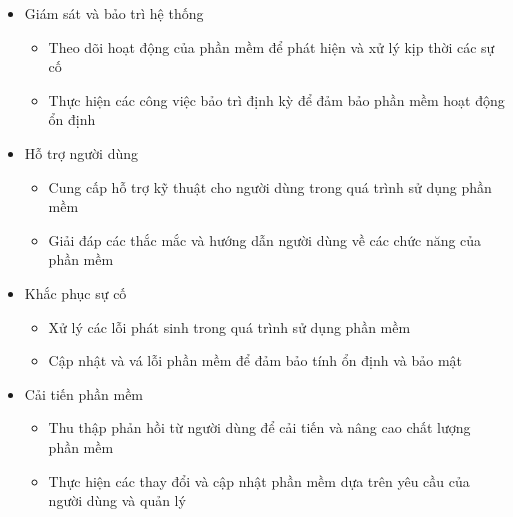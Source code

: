 {\begin{minipage}{\textwidth}
    \begin{itemize}
        \item Giám sát và bảo trì hệ thống
        \begin{itemize}
            \item Theo dõi hoạt động của phần mềm để phát hiện và xử lý kịp thời các sự cố
            \item Thực hiện các công việc bảo trì định kỳ để đảm bảo phần mềm hoạt động ổn định
        \end{itemize}
        \item Hỗ trợ người dùng
        \begin{itemize}
            \item Cung cấp hỗ trợ kỹ thuật cho người dùng trong quá trình sử dụng phần mềm
            \item Giải đáp các thắc mắc và hướng dẫn người dùng về các chức năng của phần mềm
        \end{itemize}
        \item Khắc phục sự cố
        \begin{itemize}
            \item Xử lý các lỗi phát sinh trong quá trình sử dụng phần mềm
            \item Cập nhật và vá lỗi phần mềm để đảm bảo tính ổn định và bảo mật
        \end{itemize}
        \item Cải tiến phần mềm
        \begin{itemize}
            \item Thu thập phản hồi từ người dùng để cải tiến và nâng cao chất lượng phần mềm
            \item Thực hiện các thay đổi và cập nhật phần mềm dựa trên yêu cầu của người dùng và quản lý
        \end{itemize}
    \end{itemize}
    \end{minipage}
}
\newpage
